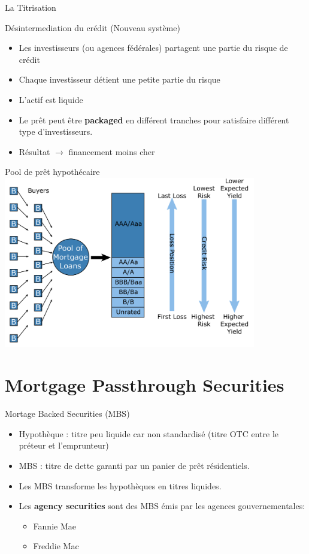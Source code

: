 \documentclass{beamer}
\begin{document}
\begin{frame}{La Titrisation}
\begin{block}{Désintermediation du crédit (Nouveau système)}
\begin{itemize}[label=\bullet]
\item Les investisseurs (ou agences fédérales) partagent une partie du risque de crédit
\item Chaque investisseur détient une petite partie du risque
\item L’actif est liquide
\item Le prêt peut être \textbf{packaged} en différent tranches pour satisfaire différent type d’investisseurs.
\item Résultat $\rightarrow$ financement moins cher
\end{itemize}
\end{block}
\end{frame}

\begin{frame}{Pool de prêt hypothécaire}
\includegraphics[width=110mm]{Pool}
\end{frame}

\section{Mortgage Passthrough Securities}

\begin{frame}{Mortage Backed Securities (MBS)}
\begin{itemize}[label=\bullet]
\item Hypothèque : titre peu liquide car non standardisé (titre OTC entre le préteur et l’emprunteur)
\item MBS : titre de dette garanti par un panier de prêt résidentiels. 
\item Les MBS transforme les hypothèques en titres liquides.
\item Les \textbf{agency securities} sont des MBS émis par les agences gouvernementales:
\begin{itemize}[label=\bullet]
\item Fannie Mae
\item Freddie Mac
\end{itemize}
\end{itemize}
\end{frame}
\end{document}

